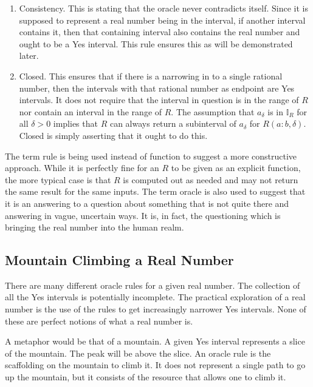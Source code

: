 \documentclass[12pt]{article}
\begin{document}
\begin{enumerate}
    \item Consistency. This is stating that the oracle never contradicts itself. Since it is supposed to represent a real number being in the interval, if another interval contains it, then that containing interval also contains the real number and ought to be a Yes interval. This rule ensures this as will be demonstrated later. 
    
    \item Closed. This ensures that if there is a narrowing in to a single rational number, then the intervals with that rational number as endpoint are Yes intervals. It does not require that the interval in question is in the range of $R$ nor contain an interval in the range of $R$. The assumption that $a_\delta$ is in $\mathbb{I}_R$ for all $\delta >0$ implies that $R$ can always return a subinterval of $a_\delta$ for $R(a:b, \delta)$. Closed is simply asserting that it ought to do this. 

\end{enumerate}

The term rule is being used instead of function to suggest a more constructive approach. While it is perfectly fine for an $R$ to be given as an explicit function, the more typical case is that $R$ is computed out as needed and may not return the same result for the same inputs. The term oracle is also used to suggest that it is an answering to a question about something that is not quite there and answering in vague, uncertain ways. It is, in fact, the questioning which is bringing the real number into the human realm.

\subsection{Mountain Climbing a Real Number}

There are many different oracle rules for a given real number. The collection of all the Yes intervals is potentially incomplete. The practical exploration of a real number is the use of the rules to get increasingly narrower Yes intervals. None of these are perfect notions of what a real number is. 

A metaphor would be that of a mountain. A given Yes interval represents a slice of the mountain. The peak will be above the slice. An oracle rule is the scaffolding on the mountain to climb it. It does not represent a single path to go up the mountain, but it consists of the resource that allows one to climb it. 
\end{document}
